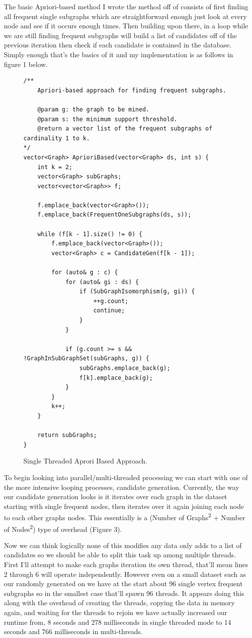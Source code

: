 \documentclass{article}
\begin{document}
The basic Apriori-based method I wrote the method off of consists of first finding all frequent single subgraphs which are straightforward enough just look at every node and see if it occurs enough times. Then building upon there, in a loop while we are still finding frequent subgraphs will build a list of candidates off of the previous iteration then check if each candidate is contained in the database. Simply enough that's the basics of it and my implementation is as follows in figure 1 below. 

\begin{figure}
\begin{lstlisting}
/**
	Apriori-based approach for finding frequent subgraphs.

	@param g: the graph to be mined.
	@param s: the minimum support threshold.
	@return a vector list of the frequent subgraphs of cardinality 1 to k.
*/
vector<Graph> AprioriBased(vector<Graph> ds, int s) {
	int k = 2;
	vector<Graph> subGraphs;
	vector<vector<Graph>> f;

	f.emplace_back(vector<Graph>());		
	f.emplace_back(FrequentOneSubgraphs(ds, s));

	while (f[k - 1].size() != 0) {
		f.emplace_back(vector<Graph>());
		vector<Graph> c = CandidateGen(f[k - 1]);
		
		for (auto& g : c) {
			for (auto& gi : ds) {
				if (SubGraphIsomorphism(g, gi)) {
					++g.count;
					continue;
				}
			}

			if (g.count >= s && !GraphInSubGraphSet(subGraphs, g)) {
				subGraphs.emplace_back(g);
				f[k].emplace_back(g);
			}
		}
		k++;
	}

	return subGraphs;
}
\end{lstlisting}
  \caption{Single Threaded Aprori Based Approach.}
  \label{fig:Single Threaded Aprori Based Approach}
\end{figure}

To begin looking into parallel/multi-threaded processing we can start with one of the more intensive looping processes, candidate generation. Currently, the way our candidate generation looks is it iterates over each graph in the dataset starting with single frequent nodes, then iterates over it again joining each node to each other graphs nodes. This essentially is a (Number of Graphs\textsuperscript{2} + Number of Nodes\textsuperscript{2}) type of overhead (Figure 3).

Now we can think logically none of this modifies any data only adds to a list of candidates so we should be able to split this task up among multiple threads. First I'll attempt to make each graphs iteration its own thread, that'll mean lines 2 through 6 will operate independently. However even on a small dataset such as our randomly generated on we have at the start about 96 single vertex frequent subgraphs so in the smallest case that'll spawn 96 threads. It appears doing this along with the overhead of creating the threads, copying the data in memory again, and waiting for the threads to rejoin we have actually increased our runtime from, 8 seconds and 278 milliseconds in single threaded mode to 14 seconds and 766 milliseconds in multi-threads.
\end{document}
